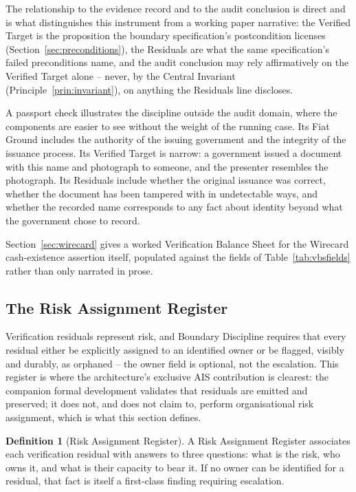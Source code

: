 \documentclass[11pt,a4paper]{article}
\theoremstyle{definition}
\newtheorem{definition}{Definition}[section]
\theoremstyle{remark}
\begin{document}
The relationship to the evidence record and to the audit conclusion is direct and is what distinguishes this instrument from a working paper narrative: the Verified Target is the proposition the boundary specification's postcondition licenses (Section~\ref{sec:preconditions}), the Residuals are what the same specification's failed preconditions name, and the audit conclusion may rely affirmatively on the Verified Target alone -- never, by the Central Invariant (Principle~\ref{prin:invariant}), on anything the Residuals line discloses.

A passport check illustrates the discipline outside the audit domain, where the components are easier to see without the weight of the running case. Its Fiat Ground includes the authority of the issuing government and the integrity of the issuance process. Its Verified Target is narrow: a government issued a document with this name and photograph to someone, and the presenter resembles the photograph. Its Residuals include whether the original issuance was correct, whether the document has been tampered with in undetectable ways, and whether the recorded name corresponds to any fact about identity beyond what the government chose to record.

Section~\ref{sec:wirecard} gives a worked Verification Balance Sheet for the Wirecard cash-existence assertion itself, populated against the fields of Table~\ref{tab:vbsfields} rather than only narrated in prose.

\subsection{The Risk Assignment Register}
\label{sec:rar}

Verification residuals represent risk, and Boundary Discipline requires that every residual either be explicitly assigned to an identified owner or be flagged, visibly and durably, as orphaned -- the owner field is optional, not the escalation. This register is where the architecture's exclusive AIS contribution is clearest: the companion formal development validates that residuals are emitted and preserved; it does not, and does not claim to, perform organisational risk assignment, which is what this section defines.

\begin{definition}[Risk Assignment Register]
\label{def:rar}
A Risk Assignment Register associates each verification residual with answers to three questions: what is the risk, who owns it, and what is their capacity to bear it. If no owner can be identified for a residual, that fact is itself a first-class finding requiring escalation.
\end{definition}
\end{document}
